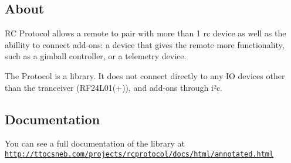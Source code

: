 \subsection*{About}

RC Protocol allows a remote to pair with more than 1 rc device as well as the abillity to connect add-\/ons\+: a device that gives the remote more functionality, such as a gimball controller, or a telemetry device.

The Protocol is a library. It does not connect directly to any IO devices other than the tranceiver (R\+F24\+L01(+)), and add-\/ons through i²c.

\subsection*{Documentation}

You can see a full documentation of the library at \href{http://ttocsneb.com/projects/rcprotocol/docs/html/annotated.html}{\tt http\+://ttocsneb.\+com/projects/rcprotocol/docs/html/annotated.\+html} 